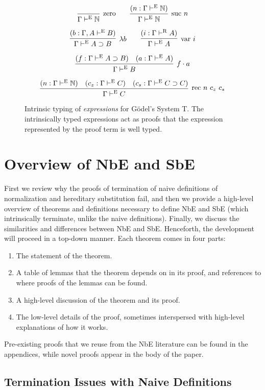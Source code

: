 \documentclass{llncs}
\def\arr{\supset}
\def\app{\cdot}
\def\lam{\lambda}
\def\nat{\mathbb{N}}
\newcommand{\turn}[1]{\vdash^\con{#1}}
\newcommand{\con}[1]{\textmd{#1}}
\newcommand{\fun}[1]{\textmd{#1}}
\newcommand{\type}[1]{\Gamma \turn{E} #1}
\newcommand{\ctype}[2]{\Gamma , #1 \turn{E} #2}
\newcommand{\typr}[1]{\Gamma \turn{R} #1}
\begin{document}
\begin{figure}[t!]
\caption{
Intrinsic typing of \textit{expressions} for G{\"o}del's System T. The
intrinsically typed expressions act as proofs that the expression
represented by the proof term is well typed.
}
$$
\infer
  [\con{zero}]
  {\type{\nat}}
{}
\qquad
\infer
  [\con{suc} ~ n]
  {\type{\nat}}
{
  (n : \type{\nat})
}
$$

$$
\infer
  [\lam b]
  {\type{A \arr B}}
{
  (b : \ctype{A}{B})
}
\qquad
\infer
  [\fun{var} ~ i]
  {\type{A}}
{
  (i : \typr{A})
}
$$

$$
\infer
  [f \app a]
  {\type{B}}
{
  (f : \type{A \arr B})
  &
  (a : \type{A})
}
$$

$$
\infer
  [\fun{rec} ~ n ~ c_z ~ c_s]
  {\type{C}}
{
  (n : \type{\nat})
  &
  (c_z : \type{C})
  &
  (c_s : \type{C \arr C})
}
$$
\label{fig:type}
\end{figure}

\section{Overview of NbE and SbE}
\label{sec:overview}

First we review why the proofs of termination of naive definitions of
normalization and hereditary substitution fail, and then we provide a
high-level overview of theorems and definitions necessary to define NbE
and SbE (which intrinsically terminate, unlike the naive definitions).
Finally, we discuss the similarities and differences between NbE and
SbE.
Henceforth, the development will proceed in a top-down manner.
Each theorem comes in four parts:

\begin{enumerate}
\item{The statement of the theorem.}
\item{A table of lemmas that the theorem depends on in its proof, and
  references to where proofs of the lemmas can be found.}
\item{A high-level discussion of the theorem and its proof.}
\item{The low-level details of the proof, sometimes interspersed with
  high-level explanations of how it works.}
\end{enumerate}

Pre-existing proofs that we reuse from the NbE literature can be found
in the appendices, while novel proofs appear in the body of the paper.

\subsection{Termination Issues with Naive Definitions}
\end{document}
